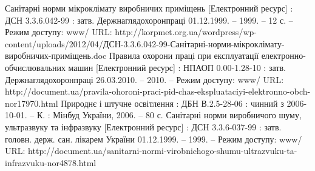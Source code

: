 \begin{thebibliography}{}
     Санітарні норми мікроклімату виробничих приміщень [Електронний ресурс] : ДСН 3.3.6.042-99 : затв. Держнаглядохоронпраці 01.12.1999. -- 1999. -- 12 с. -- Режим доступу: www/ URL: http://korpmet.org.ua/wordpress/wp-content/uploads/2012/04/ДСН-3.3.6.042-99-Санітарні-норми-мікроклімату-виробничих-приміщень.doc
     Правила охорони праці при експлуатації електронно-обчислювальних машин [Електронний ресурс] : НПАОП 0.00-1.28-10 : затв. Держнаглядохоронпраці 26.03.2010. -- 2010. -- Режим доступу: www/ URL: http://document.ua/pravila-ohoroni-praci-pid-chas-ekspluataciyi-elektronno-obch-nor17970.html
     Природнє і штучне освітлення : ДБН В.2.5-28-06 : чинний з 2006-10-01. -- К. : Мінбуд України, 2006. -- 80 с.
     Санітарні норми виробничого шуму, ультразвуку та інфразвуку [Електронний ресурс] : ДСН 3.3.6-037-99 : затв. головн. держ. сан. лікарем України 01.12.1999. -- 1999. -- Режим доступу: www/ URL: http://document.ua/sanitarni-normi-virobnichogo-shumu-ultrazvuku-ta-infrazvuku-nor4878.html
\end{thebibliography}
